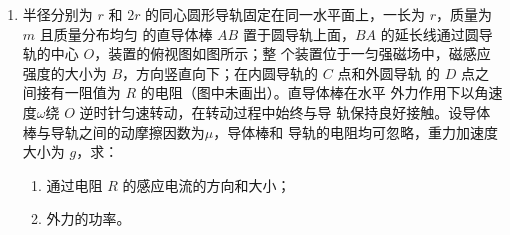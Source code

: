 \begin{enumerate}
\item 
{}
半径分别为 $ r $ 和 $ 2r $ 的同心圆形导轨固定在同一水平面上，一长为 $ r $，质量为 $ m $ 且质量分布均匀
的直导体棒 $ AB $ 置于圆导轨上面，$ BA $ 的延长线通过圆导轨的中心 $ O $，装置的俯视图如图所示；整
个装置位于一匀强磁场中，磁感应强度的大小为 $ B $，方向竖直向下；在内圆导轨的 $ C $ 点和外圆导轨
的 $ D $ 点之间接有一阻值为 $ R $ 的电阻（图中未画出）。直导体棒在水平
外力作用下以角速度$ \omega $绕 $ O $ 逆时针匀速转动，在转动过程中始终与导
轨保持良好接触。设导体棒与导轨之间的动摩擦因数为$ \mu $，导体棒和
导轨的电阻均可忽略，重力加速度大小为 $ g $，求：
\begin{enumerate}
\item
通过电阻 $ R $ 的感应电流的方向和大小；

\item 
外力的功率。

\end{enumerate}
\begin{figure}[h!]
\flushright

\end{figure}



\end{enumerate}
